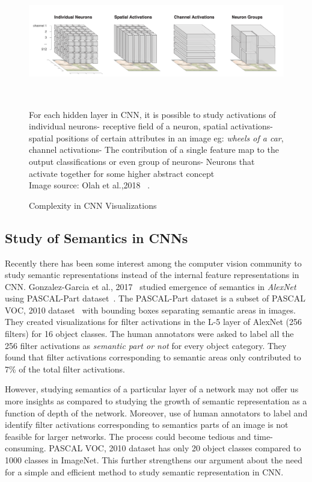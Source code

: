 \begin{figure}[t]
\centering
\includegraphics[width=14cm, height=5cm]{Figures/Maps}
\caption{Complexity in CNN Visualizations}
\label{Interpretability}
For each hidden layer in CNN, it is possible to study activations of individual neurons- receptive field of a neuron, spatial activations- spatial positions of certain attributes in an image eg: \textit{wheels of a car}, channel activations- The contribution of a single feature map to the output classifications or even group of neurons- Neurons that activate together for some higher abstract concept\\Image source: Olah et al.,2018  ~\cite{distill2}.
\end{figure}

\subsection{Study of Semantics in CNNs}

Recently there has been some interest among the computer vision community to study semantic representations instead of the internal feature representations in CNN. Gonzalez-Garcia et al., 2017~\cite{SemanticCNN} studied emergence of semantics in \textit{AlexNet} using PASCAL-Part dataset~\cite{Pascal_part}. The PASCAL-Part dataset is a subset of PASCAL VOC, 2010 dataset~\cite{pascal-voc-2010} with bounding boxes separating semantic areas in images. They created visualizations for filter activations in the L-5 layer of AlexNet (256 filters) for 16 object classes. The human annotators were asked to label all the 256 filter activations as \textit{semantic part or not} for every object category. They found that filter activations corresponding to semantic areas only contributed to 7\% of the total filter activations. 


However, studying semantics of a particular layer of a network may not offer us more insights as compared to studying the growth of semantic representation as a function of depth of the network. Moreover, use of human annotators to label and identify filter activations corresponding to semantics parts of an image is not feasible for larger networks. The process could become tedious and time-consuming. PASCAL VOC, 2010 dataset has only 20 object classes compared to 1000 classes in ImageNet. This further strengthens our argument about the need for a simple and efficient method to study semantic representation in CNN.

